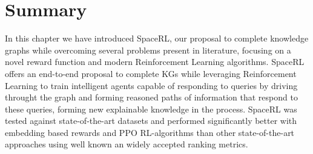 \section{Summary}\label{sec:spacerl-summary}
In this chapter we have introduced SpaceRL, our proposal to complete knowledge graphs while overcoming several problems present in literature, focusing on a novel reward function and modern Reinforcement Learning algorithms.
SpaceRL offers an end-to-end proposal to complete KGs while leveraging Reinforcement Learning to train intelligent agents capable of responding to queries by driving throught the graph and forming reasoned paths of information that respond to these queries, forming new explainable knowledge in the process.
SpaceRL was tested against state-of-the-art datasets and performed significantly better with embedding based rewards and PPO RL-algorithms than other state-of-the-art approaches using well known an widely accepted ranking metrics.
